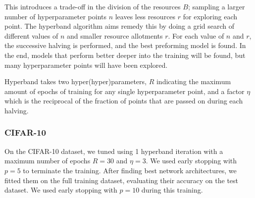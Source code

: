         This introduces a trade-off in the division of the resources $B$; sampling a larger number of hyperparameter points $n$ leaves less resources $r$ for exploring each point. The hyperband algorithm aims remedy this by doing a grid search of different values of $n$ and smaller resource allotments $r$. For each value of $n$ and $r$, the successive halving is performed, and the best preforming model is found. In the end, models that perform better deeper into the training will be found, but many hyperparameter points will have been explored.

        Hyperband takes two hyper(hyper)parameters, $R$ indicating the maximum amount of epochs of training for any single hyperparameter point, and a factor $\eta$ which is the reciprocal of the fraction of points that are passed on during each halving.



    \subsubsection{CIFAR-10}
        On the CIFAR-10 dataset, we tuned using 1 hyperband iteration with a maximum number of epochs $R=30$ and $\eta=3$. We used early stopping with $p=5$ to terminate the training. After finding best network architectures, we fitted them on the full training dataset, evaluating their accuracy on the test dataset. We used early stopping with $p=10$ during this training.

